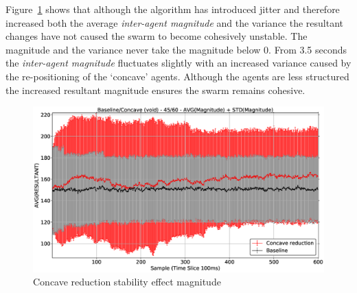 Figure~\ref{voids:ConcavePerimeter4560-MAG} shows that although the algorithm has introduced jitter and therefore increased both the average \textit{inter-agent magnitude} and the variance the resultant changes have not caused the swarm to become cohesively unstable. The magnitude and the variance never take the magnitude below 0. From 3.5 seconds the \textit{inter-agent magnitude} fluctuates slightly with an increased variance caused by the re-positioning of the `concave' agents. Although the agents are less structured the increased resultant magnitude ensures the swarm remains cohesive. 
\begin{figure}[H]
\begin{center}
\includegraphics[width=15cm]{CHAPTER-7/figures/ConcavePerimeter4560-MAG}
\end{center}
\caption{Concave reduction stability effect magnitude\label{voids:ConcavePerimeter4560-MAG}}
\end{figure}

